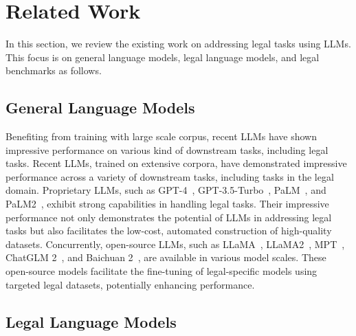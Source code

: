 \section{Related Work}
\label{sec:relatedwork}

In this section, we review the existing work on addressing legal tasks using LLMs. This focus is on general language models, legal language models, and legal benchmarks as follows. 

\subsection{General Language Models}

Benefiting from training with large scale corpus, recent LLMs have shown impressive performance on various kind of downstream tasks, including legal tasks. Recent LLMs, trained on extensive corpora, have demonstrated impressive performance across a variety of downstream tasks, including tasks in the legal domain. 
Proprietary LLMs, such as GPT-4~\citep{GPT4}, GPT-3.5-Turbo~\citep{GPT35T}, PaLM~\citep{Chowdhery23PaLM}, and PaLM2~\citep{Rohan23PaLM2}, exhibit strong capabilities in handling legal tasks. 
Their impressive performance not only demonstrates the potential of LLMs in addressing legal tasks but also facilitates the low-cost, automated construction of high-quality datasets.
Concurrently, open-source LLMs, such as LLaMA~\citep{hugo23LLaMA}, LLaMA2~\citep{hugo23LLaMA2}, MPT~\citep{MosaicML2023mtp7B}, ChatGLM 2~\citep{du2022glm}, and Baichuan 2~\citep{aiyun23baichuan}, are available in various model scales. These open-source models facilitate the fine-tuning of legal-specific models using targeted legal datasets, potentially enhancing performance.

\subsection{Legal Language Models}


